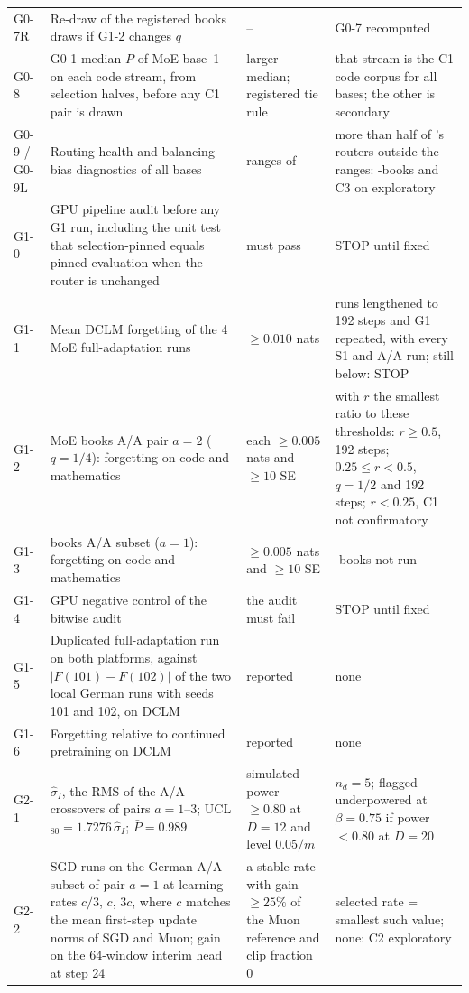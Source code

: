 \begin{longtable}{@{}>{\raggedright\arraybackslash}p{1.15cm}>{\raggedright\arraybackslash}p{5.4cm}>{\raggedright\arraybackslash}p{2.7cm}>{\raggedright\arraybackslash}p{5.2cm}@{}}
G0-7R & Re-draw of the registered books draws if G1-2 changes $q$ & -- & G0-7 recomputed\\
G0-8 & G0-1 median $P$ of MoE base~1 on each code stream, from selection halves, before any C1 pair is drawn & larger median; registered tie rule & that stream is the C1 code corpus for all bases; the other is secondary\\
G0-9 / G0-9L & Routing-health and balancing-bias diagnostics of all bases & ranges of \citep[App.~C.6]{chu2026nested} & more than half of \nestor{}'s routers outside the ranges: \nestor{}-books and C3 on \nestor{} exploratory\\
G1-0 & GPU pipeline audit before any G1 run, including the unit test that selection-pinned equals pinned evaluation when the router is unchanged & must pass & STOP until fixed\\
G1-1 & Mean DCLM forgetting of the 4 MoE full-adaptation runs & $\ge0.010$ nats & runs lengthened to 192 steps and G1 repeated, with every S1 and \nestor{} A/A run; still below: STOP\\
G1-2 & MoE books A/A pair $a=2$ ($q=1/4$): forgetting on code and mathematics & each $\ge0.005$ nats and $\ge10$ SE & with $r$ the smallest ratio to these thresholds: $r\ge0.5$, 192 steps; $0.25\le r<0.5$, $q=1/2$ and 192 steps; $r<0.25$, C1 not confirmatory\\
G1-3 & \nestor{} books A/A subset ($a=1$): forgetting on code and mathematics & $\ge0.005$ nats and $\ge10$ SE & \nestor{}-books not run\\
G1-4 & GPU negative control of the bitwise audit & the audit must fail & STOP until fixed\\
G1-5 & Duplicated \nestor{} full-adaptation run on both platforms, against $|F(101)-F(102)|$ of the two local \nestor{} German runs with seeds 101 and 102, on DCLM & reported & none\\
G1-6 & Forgetting relative to continued pretraining on DCLM & reported & none\\
G2-1 & $\hat\sigma_I$, the RMS of the A/A crossovers of pairs $a=1$--3; UCL$_{80}=1.7276\,\hat\sigma_I$; $\bar P=0.989$ & simulated power $\ge0.80$ at $D=12$ and level $0.05/m$ & $n_d=5$; flagged underpowered at $\beta=0.75$ if power $<0.80$ at $D=20$\\
G2-2 & 3 SGD runs on the German A/A subset of pair $a=1$ at learning rates $c/3$, $c$, $3c$, where $c$ matches the mean first-step update norms of SGD and Muon; gain on the 64-window interim head at step 24 & a stable rate with gain $\ge25\%$ of the Muon reference and clip fraction 0 & selected rate = smallest such value; none: C2 exploratory\\

\end{longtable}
